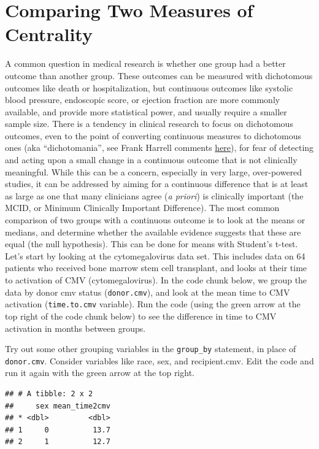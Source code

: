 \documentclass[
]{book}
\begin{document}
\hypertarget{comparing-two-measures-of-centrality}{%
\chapter{Comparing Two Measures of Centrality}\label{comparing-two-measures-of-centrality}}

A common question in medical research is whether one group had a better outcome than another group. These outcomes can be measured with dichotomous outcomes like death or hospitalization,
but continuous outcomes like systolic blood pressure, endoscopic score, or ejection fraction are more commonly available, and provide more statistical power, and usually require a smaller sample size.
There is a tendency in clinical research to focus on dichotomous outcomes, even to the point of converting continuous measures to dichotomous ones (aka ``dichotomania'', see Frank Harrell comments \href{http://biostat.mc.vanderbilt.edu/wiki/Main/CatContinuous}{here}), for fear of detecting and acting upon a small change in a continuous outcome that is not clinically meaningful.
While this can be a concern, especially in very large, over-powered studies, it can be addressed by aiming for a continuous difference that is at least as large as one that many clinicians agree (\emph{a priori}) is clinically important (the MCID, or Minimum Clinically Important Difference).
The most common comparison of two groups with a continuous outcome is to look at the means or medians, and determine whether the available evidence suggests that these are equal (the null hypothesis). This can be done for means with Student's t-test.
Let's start by looking at the cytomegalovirus data set. This includes data on 64 patients who received bone marrow stem cell transplant, and looks at their time to activation of CMV (cytomegalovirus). In the code chunk below, we group the data by donor cmv status (\texttt{donor.cmv}), and look at the mean time to CMV activation (\texttt{time.to.cmv} variable). Run the code (using the green arrow at the top right of the code chunk below) to see the difference in time to CMV activation in months between groups.

Try out some other grouping variables in the \texttt{group\_by} statement, in place of \texttt{donor.cmv}.
Consider variables like race, sex, and recipient.cmv. Edit the code and run it again with the green arrow at the top right.

\begin{verbatim}
## # A tibble: 2 x 2
##     sex mean_time2cmv
## * <dbl>         <dbl>
## 1     0          13.7
## 2     1          12.7
\end{verbatim}
\end{document}
